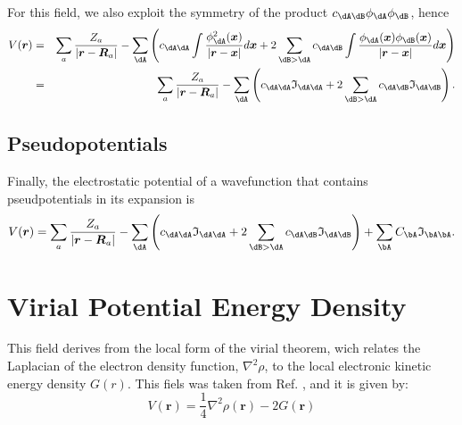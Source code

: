 For this field, we also exploit the symmetry of the product $c_{\dA\dB}\phi_{\dA}\phi_{\dB}$, hence
%
\begin{eqnarray}
   V(\boldsymbol{r})&=&\sum_a\frac{Z_a}{|\boldsymbol{r}-\boldsymbol{R}_a|}-
   \sum_{\dA}\left(c_{\dA\dA}\int\frac{\phi_{\dA}^2(\boldsymbol{x})}{|\boldsymbol{r}-\boldsymbol{x}|}d\boldsymbol{x}+2\sum_{\dB>\dA}c_{\dA\dB}\int\frac{\phi_{\dA}(\boldsymbol{x})\phi_{\dB}(\boldsymbol{x})}{|\boldsymbol{r}-\boldsymbol{x}|}d\boldsymbol{x}\right)\nonumber\\
   &=&\sum_a\frac{Z_a}{|\boldsymbol{r}-\boldsymbol{R}_a|}-
   \sum_{\dA}\left(c_{\dA\dA}\mathfrak{I}_{\dA\dA}+2\sum_{\dB>\dA}c_{\dA\dB}\mathfrak{I}_{\dA\dB}\right).
\end{eqnarray}
%

\subsection{Pseudopotentials}

Finally, the electrostatic potential of a wavefunction that contains pseudpotentials
in its expansion is
%
\begin{equation}%
  V(\boldsymbol{r})=\sum_a\frac{Z_a}{|\boldsymbol{r}-\boldsymbol{R}_a|}-
   \sum_{\dA}\left(c_{\dA\dA}\mathfrak{I}_{\dA\dA}+
   2\sum_{\dB>\dA}c_{\dA\dB}\mathfrak{I}_{\dA\dB}\right)+
   \sum_{\bA}C_{\bA}\mathfrak{I}_{\bA\bA}.
\end{equation}
%

\section{Virial Potential Energy Density}
This field derives from the local form of the virial theorem, wich relates the
Laplacian of the electron density function,
$\nabla^2\rho$, to the local electronic kinetic energy density $G(r)$. This fiels was
taken from Ref. \cite{bib:espinosa1998}, and it is given by:
\begin{equation}
	V(\boldsymbol{r})= \frac{1}{4} \nabla^2\rho(\boldsymbol{r})-2G(\boldsymbol{r})	
\end{equation}

